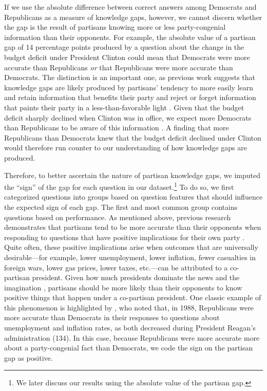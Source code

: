 \documentclass[12pt, letterpaper]{article}
\begin{document}
If we use the absolute difference between correct answers among Democrats and Republicans as a measure of knowledge gaps, however, we cannot discern whether the gap is the result of partisans knowing more or less party-congenial information than their opponents. For example, the absolute value of a partisan gap of 14 percentage points produced by a question about the change in the budget deficit under President Clinton could mean that Democrats were more accurate than Republicans \textit{or} that Republicans were more accurate than Democrats. The distinction is an important one, as previous work suggests that knowledge gaps are likely produced by partisans' tendency to more easily learn and retain information that benefits their party and reject or forget information that paints their party in a less-than-favorable light \citep{jerit2012partisan}. Given that the budget deficit sharply declined when Clinton was in office, we expect more Democrats than Republicans to be aware of this information \citep{jerit2012partisan}. A finding that more Republicans than Democrats knew that the budget deficit declined under Clinton would therefore run counter to our understanding of how knowledge gaps are produced. 

Therefore, to better ascertain the nature of partisan knowledge gaps, we imputed the ``sign'' of the gap for each question in our dataset.\footnote{We later discuss our results using the absolute value of the partisan gap.} To do so, we first categorized questions into groups based on question features that should influence the expected sign of each gap. The first and most common group contains questions based on performance. As mentioned above, previous research demonstrates that partisans tend to be more accurate than their opponents when responding to questions that have positive implications for their own party \citep{jerit2012partisan}. Quite often, these positive implications arise when outcomes that are universally desirable---for example, lower unemployment, lower inflation, fewer casualties in foreign wars, lower gas prices, lower taxes, etc.---can be attributed to a co-partisan president. Given how much presidents dominate the news \citep{hopkins2018increasingly} and the imagination \citep{jacobson_2019}, partisans should be more likely than their opponents to know positive things that happen under a co-partisan president. One classic example of this phenomenon is highlighted by \citet{bartels_2002}, who noted that, in 1988, Republicans were more accurate than Democrats in their responses to questions about unemployment and inflation rates, as both decreased during President Reagan's administration (134). In this case, because Republicans were more accurate more about a party-congenial fact than Democrats, we code the sign on the partisan gap as positive. 
\end{document}
